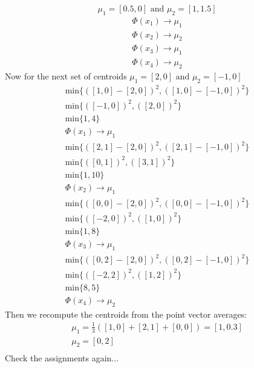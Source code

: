 \documentclass[12pt]{article}
\begin{document}
\begin{enumerate}[label=(\alph*)]
			\[
				\mu_1 = [0.5, 0] \text{ and } \mu_2 = [1, 1.5]
			\]
			\begin{gather*}
				\Phi(x_1) \rightarrow \mu_1 \\
				\Phi(x_2) \rightarrow \mu_2 \\
				\Phi(x_3) \rightarrow \mu_1 \\
				\Phi(x_4) \rightarrow \mu_2
			\end{gather*}
			Now for the next set of centroids
			\(\mu_1 = [2, 0] \text{ and } \mu_2 = [-1, 0]\)
			\begin{gather*}
				\text{min} \{ ( [1,0] - [2, 0] )^2, ( [1,0] - [-1, 0] )^2\} \\
				\text{min} \{ ( [-1,0] )^2, ( [2, 0] )^2\} \\
				\text{min} \{ 1, 4\} \\
				\Phi(x_1) \rightarrow \mu_1
			\end{gather*}
			\begin{gather*}
				\text{min} \{ ( [2,1] - [2, 0] )^2, ( [2,1] - [-1, 0] )^2\} \\
				\text{min} \{ ( [0,1] )^2, ( [3, 1] )^2\} \\
				\text{min} \{ 1, 10\} \\
				\Phi(x_2) \rightarrow \mu_1
			\end{gather*}
			\begin{gather*}
				\text{min} \{ ( [0,0] - [2, 0] )^2, ( [0,0] - [-1, 0] )^2\} \\
				\text{min} \{ ( [-2,0] )^2, ( [1, 0] )^2\} \\
				\text{min} \{ 1, 8\} \\
				\Phi(x_3) \rightarrow \mu_1
			\end{gather*}
			\begin{gather*}
				\text{min} \{ ( [0,2] - [2, 0] )^2, ( [0,2] - [-1, 0] )^2\} \\
				\text{min} \{ ( [-2,2] )^2, ( [1, 2] )^2\} \\
				\text{min} \{ 8, 5\} \\
				\Phi(x_4) \rightarrow \mu_2
			\end{gather*}
			Then we recompute the centroids from the point vector averages:
			\begin{gather*}
				\mu_1 = \frac{1}{3} ( [1,0] + [2, 1] + [0, 0] ) =  [1, 0.3] \\
				\mu_2 = [0, 2] \\
			\end{gather*}
			Check the assignments again...
			\begin{gather*}

\end{gather*}
\end{enumerate}
\end{document}
